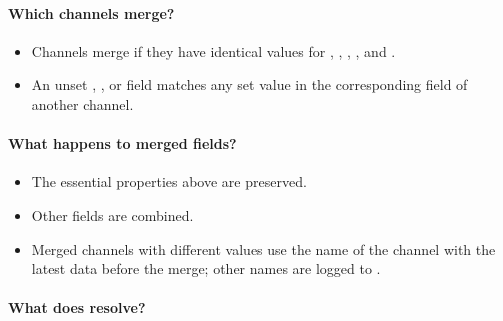 \documentclass[letterpaper,11pt,english]{sphinxmanual}
\begin{document}
\paragraph{Which channels merge?}
\label{\detokenize{src/Processing/processing:which-channels-merge}}\begin{itemize}
\item {} 
Channels merge if they have identical values for , , , , and .

\item {} 
An unset , , or  field matches any set value in the corresponding field of another channel.

\end{itemize}


\paragraph{What happens to merged fields?}
\label{\detokenize{src/Processing/processing:what-happens-to-merged-fields}}\begin{itemize}
\item {} 
The essential properties above are preserved.

\item {} 
Other fields are combined.

\item {} 
Merged channels with different  values use the name of the channel with the latest data before the merge; other names are logged to .

\end{itemize}


\paragraph{What does  resolve?}
\label{\detokenize{src/Processing/processing:what-does-merge-resolve}}
\end{document}
